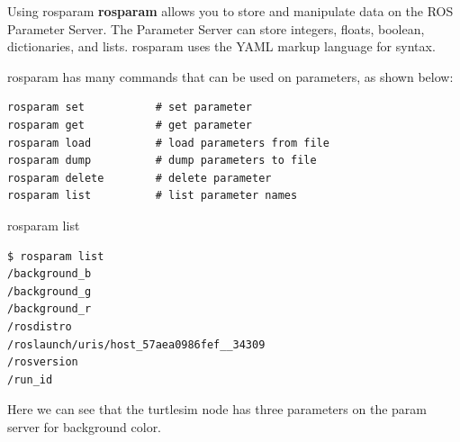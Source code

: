 \begin{frame}[fragile]{Using rosparam}
\textbf{rosparam} allows you to store and manipulate data on the ROS Parameter Server. The Parameter Server can store integers, floats, boolean, dictionaries, and lists. rosparam uses the YAML markup language for syntax. 

\vspace{.1cm}
rosparam has many commands that can be used on parameters, as shown below:

\begin{lstlisting}[language=syntax]
rosparam set           # set parameter
rosparam get           # get parameter
rosparam load          # load parameters from file
rosparam dump          # dump parameters to file
rosparam delete        # delete parameter
rosparam list          # list parameter names
\end{lstlisting}
\end{frame}

\begin{frame}[fragile]{rosparam list}
\begin{lstlisting}[language=shell]
$ rosparam list
/background_b
/background_g
/background_r
/rosdistro
/roslaunch/uris/host_57aea0986fef__34309
/rosversion
/run_id
\end{lstlisting}
Here we can see that the turtlesim node has three parameters on the param server for background color.
\end{frame}

